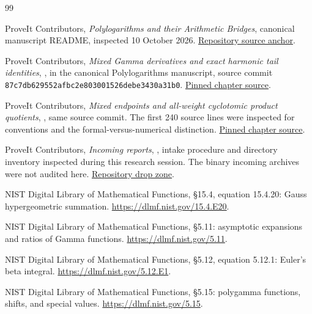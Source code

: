 \begin{thebibliography}{99}

ProveIt Contributors,
\emph{Polylogarithms and their Arithmetic Bridges}, canonical manuscript
README, inspected 10 October 2026.
\href{https://github.com/VladimirReshetnikov/ProveIt/blob/87c7db629552afbc2e803001526debe3430a31b0/Analysis/Polylogarithms/docs/manuscript/README.md}{Repository source anchor}.

ProveIt Contributors,
\emph{Mixed Gamma derivatives and exact harmonic tail identities},
, in the canonical
Polylogarithms manuscript, source commit
\texttt{87c7db629552afbc2e803001526debe3430a31b0}.
\href{https://github.com/VladimirReshetnikov/ProveIt/blob/87c7db629552afbc2e803001526debe3430a31b0/Analysis/Polylogarithms/docs/manuscript/chapters/07-mixed-dougall-identities.tex}{Pinned chapter source}.

ProveIt Contributors,
\emph{Mixed endpoints and all-weight cyclotomic product quotients},
, same source commit.
The first 240 source lines were inspected for conventions and the
formal-versus-numerical distinction.
\href{https://github.com/VladimirReshetnikov/ProveIt/blob/87c7db629552afbc2e803001526debe3430a31b0/Analysis/Polylogarithms/docs/manuscript/chapters/04-cyclotomic-quotients.tex}{Pinned chapter source}.

ProveIt Contributors,
\emph{Incoming reports}, , intake procedure
and directory inventory inspected during this research session.
The binary incoming archives were not audited here.
\href{https://github.com/VladimirReshetnikov/ProveIt/tree/main/docs/incoming}{Repository drop zone}.

NIST Digital Library of Mathematical Functions,
\S15.4, equation 15.4.20: Gauss hypergeometric summation.
\url{https://dlmf.nist.gov/15.4.E20}.

NIST Digital Library of Mathematical Functions,
\S5.11: asymptotic expansions and ratios of Gamma functions.
\url{https://dlmf.nist.gov/5.11}.

NIST Digital Library of Mathematical Functions,
\S5.12, equation 5.12.1: Euler's beta integral.
\url{https://dlmf.nist.gov/5.12.E1}.

NIST Digital Library of Mathematical Functions,
\S5.15: polygamma functions, shifts, and special values.
\url{https://dlmf.nist.gov/5.15}.


\end{thebibliography}
